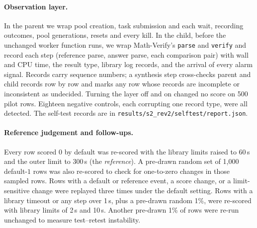 \documentclass[10pt,a4paper]{article}
\newcommand{\mv}{Math-Verify}
\begin{document}
\paragraph{Observation layer.}
In the parent we wrap pool creation, task submission and each wait, recording
outcomes, pool generations, resets and every kill. In the child, before the
unchanged worker function runs, we wrap \mv{}'s \texttt{parse} and
\texttt{verify} and record each step (reference parse, answer parse, each
comparison pair) with wall and CPU time, the result type, library log
records, and the arrival of every alarm signal. Records carry sequence
numbers; a synthesis step cross-checks parent and child records row by row
and marks any row whose records are incomplete or inconsistent as undecided.
Turning the layer off and on changed no score on 500 pilot rows. Eighteen
negative controls, each corrupting one record type, were all detected.
The self-test records are in \texttt{results/s2\_rev2/selftest/report.json}.

\paragraph{Reference judgement and follow-ups.}
Every row scored $0$ by default was re-scored with the library limits raised
to 60\,s and the outer limit to 300\,s (the \emph{reference}). A pre-drawn
random set of 1,000 default-$1$ rows was also re-scored to check for
one-to-zero changes in those sampled rows. Rows with a default or reference event,
a score change, or a limit-sensitive change were replayed three times under
the default setting. Rows with a library timeout or any step over 1\,s, plus a
pre-drawn random 1\%, were re-scored with library limits of 2\,s and 10\,s.
Another pre-drawn 1\% of rows were re-run unchanged to measure test--retest
instability.
\end{document}

